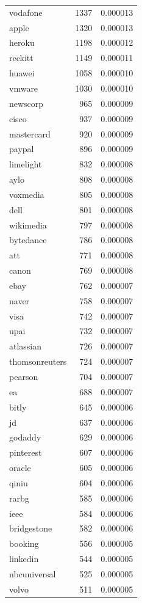 \begin{tabular}{lrr}
vodafone & 1337 & 0.000013 \\
apple & 1320 & 0.000013 \\
heroku & 1198 & 0.000012 \\
reckitt & 1149 & 0.000011 \\
huawei & 1058 & 0.000010 \\
vmware & 1030 & 0.000010 \\
newscorp & 965 & 0.000009 \\
cisco & 937 & 0.000009 \\
mastercard & 920 & 0.000009 \\
paypal & 896 & 0.000009 \\
limelight & 832 & 0.000008 \\
aylo & 808 & 0.000008 \\
voxmedia & 805 & 0.000008 \\
dell & 801 & 0.000008 \\
wikimedia & 797 & 0.000008 \\
bytedance & 786 & 0.000008 \\
att & 771 & 0.000008 \\
canon & 769 & 0.000008 \\
ebay & 762 & 0.000007 \\
naver & 758 & 0.000007 \\
visa & 742 & 0.000007 \\
upai & 732 & 0.000007 \\
atlassian & 726 & 0.000007 \\
thomsonreuters & 724 & 0.000007 \\
pearson & 704 & 0.000007 \\
ea & 688 & 0.000007 \\
bitly & 645 & 0.000006 \\
jd & 637 & 0.000006 \\
godaddy & 629 & 0.000006 \\
pinterest & 607 & 0.000006 \\
oracle & 605 & 0.000006 \\
qiniu & 604 & 0.000006 \\
rarbg & 585 & 0.000006 \\
ieee & 584 & 0.000006 \\
bridgestone & 582 & 0.000006 \\
booking & 556 & 0.000005 \\
linkedin & 544 & 0.000005 \\
nbcuniversal & 525 & 0.000005 \\
volvo & 511 & 0.000005 \\

\end{tabular}
